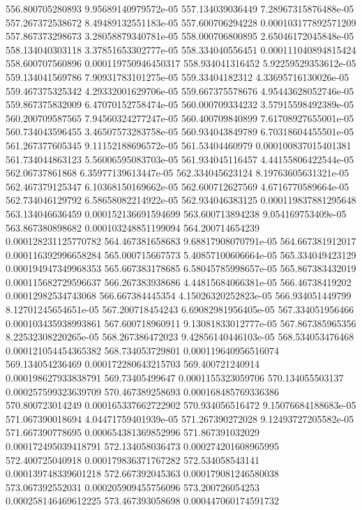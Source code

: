 {556.800705280893 9.95689140979572e-05
557.134039036449 7.28967315876488e-05
557.267372538672 8.49489132551183e-05
557.600706294228 0.000103177892571209
557.867373298673 3.28058879340781e-05
558.000706800895 2.65046172045848e-05
558.134040303118 3.37851653302777e-05
558.334040556451 0.000111040894815424
558.600707560896 0.000119750946450317
558.934041316452 5.92259529353612e-05
559.134041569786 7.90931783101275e-05
559.33404182312 4.33695716130026e-05
559.467375325342 4.29332001629706e-05
559.667375578676 4.95443628052746e-05
559.867375832009 6.47070152758474e-05
560.000709334232 3.57915598492389e-05
560.200709587565 7.94560324277247e-05
560.400709840899 7.61708927655001e-05
560.734043596455 3.46507573283758e-05
560.934043849789 6.70318604455501e-05
561.267377605345 9.11152188696572e-05
561.53404460979 0.000100837015401381
561.734044863123 5.56006595083703e-05
561.934045116457 4.44155806422544e-05
562.06737861868 6.35977139613447e-05
562.334045623124 8.19763605631321e-05
562.467379125347 6.10368150169662e-05
562.600712627569 4.6716770589664e-05
562.734046129792 6.58658082214922e-05
562.934046383125 0.000119837881295648
563.134046636459 0.000152136691594699
563.600713894238 9.054169753409e-05
563.867380898682 0.000103248851199094
564.200714654239 0.000128231125770782
564.467381658683 9.68817908070791e-05
564.667381912017 0.000116392996658284
565.000715667573 5.40857100606664e-05
565.334049423129 0.000194947349968353
565.667383178685 6.58045785998657e-05
565.867383432019 0.000115682729596637
566.267383938686 4.44815684066381e-05
566.46738419202 0.00012982534743068
566.667384445354 4.15026320252823e-05
566.934051449799 8.12701245654651e-05
567.200718454243 6.69082981956405e-05
567.334051956466 0.000103435938993861
567.600718960911 9.13081833012777e-05
567.867385965356 8.22532308220265e-05
568.267386472023 9.42856140446103e-05
568.534053476468 0.000121054454365382
568.734053729801 0.000119640956516074
569.134054236469 0.000172280643215703
569.400721240914 0.000198627933838791
569.73405499647 0.0001155323059706
570.134055503137 0.000257599323639709
570.467389258693 0.000168485769336386
570.800723014249 0.000165337662722902
570.934056516472 9.15076684188683e-05
571.067390018694 4.04471759401939e-05
571.267390272028 9.12493727205582e-05
571.667390778695 0.000654381369852996
571.867391032029 0.000172495039418791
572.134058036473 0.000274201608965995
572.400725040918 0.000179836371767282
572.534058543141 0.000139748339601218
572.667392045363 0.000179081246580038
573.067392552031 0.000205909455756096
573.200726054253 0.000258146469612225
573.467393058698 0.000447060174591732
}
